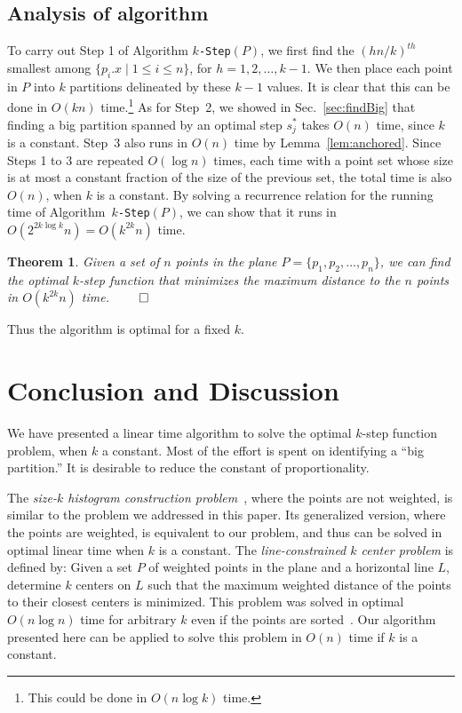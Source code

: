 \documentclass[preprint,10pt]{elsarticle}
\newcommand{\QED}{\hfill$\qed$}
\newtheorem{theorem}{Theorem}
\begin{document}
\subsection{Analysis of algorithm}
To carry out Step 1 of Algorithm {\tt $k$-Step}$(P)$, 
we first find the $(hn/k)^{th}$ smallest among $\{p_i.x \mid 1\leq i \leq n\}$,
for $h=1, 2, \ldots, k-1$.
We then place each point in $P$ into $k$ partitions delineated by these
$k-1$ values.
It is clear that this can be done in $O(kn)$ time.\footnote{This could be done in $O(n\log k)$ time.}
As for Step~2,
we showed in Sec.~\ref{sec:findBig} that finding a big partition spanned by an optimal step
$s_j^*$ takes $O(n)$ time, since $k$ is a constant.
Step~3 also runs in $O(n)$ time by Lemma~\ref{lem:anchored}.
Since Steps 1 to 3 are repeated $O(\log n)$ times,
each time with a point set whose size is at most a constant fraction of the size of the previous set,
the total time is also $O(n)$, when $k$ is a constant.
By solving a recurrence relation for the running time of Algorithm~{\tt $k$-Step}$(P)$,
we can show that it runs in $O(2^{2k\log k}n)=O(k^{2k}n)$ time.

\begin{theorem}
Given a set of $n$ points in the plane $P=\{p_1,p_2,\ldots, p_n\}$,
we can find the optimal $k$-step function that minimizes the maximum distance
to the $n$ points in $O(k^{2k} n)$ time.
\QED
\end{theorem}
Thus the algorithm is optimal for a fixed $k$.



\section{Conclusion and Discussion}\label{sec:conclusion}
We have presented a linear time algorithm to solve the optimal $k$-step function problem,
when $k$ a constant.
Most of the effort is spent on identifying a ``big partition.''
It is desirable to reduce the constant of proportionality. 

The {\em size-$k$ histogram construction problem}~\cite{guha2007},
where the points are not weighted, 
is similar to the problem we addressed in this paper.
Its generalized version,
where the points are weighted,
is equivalent to our problem, and thus can be solved in optimal linear time when $k$ is a constant.
The {\em line-constrained $k$ center problem} is defined by:
Given a set $P$ of weighted points in the plane and a horizontal line $L$,
determine $k$ centers on $L$
such that the maximum weighted distance of the points to their closest centers is minimized.
This problem was solved in optimal $O(n\log n)$ time for arbitrary $k$ even if the points
are sorted~\cite{karmakar2013,wang2014a}.
Our algorithm presented here can be applied to solve this problem 
in $O(n)$ time if $k$ is a constant.
\end{document}
